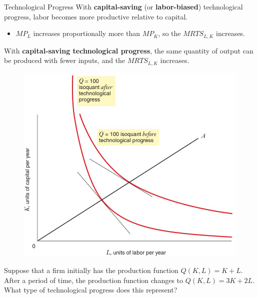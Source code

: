 \documentclass[11pt,t]{beamer}
\begin{document}
\begin{frame}{Technological Progress}
  With \textbf{capital-saving} (or \textbf{labor-biased}) technological progress, labor becomes more productive relative to capital.
  
  \bigskip
  \begin{itemize}
    \item $MP_L$ increases proportionally more than $MP_K$, so the $MRTS_{L,K}$ increases.
  \end{itemize}
\end{frame}

\begin{frame}
  With \textbf{capital-saving technological progress}, the same quantity of output can be produced with fewer inputs, and the $MRTS_{L,K}$ increases.

  \bigskip
  \begin{figure}
    \includegraphics[width=0.6\linewidth]{figures/fig6_22.jpg}
  \end{figure}
\end{frame}

\begin{frame}
  
  \bigskip
  Suppose that a firm initially has the production function $Q(K,L) = K+L$. After a period of time, the production function changes to $Q(K,L) = 3K+2L$. What type of technological progress does this represent?
\end{frame}
\end{document}
